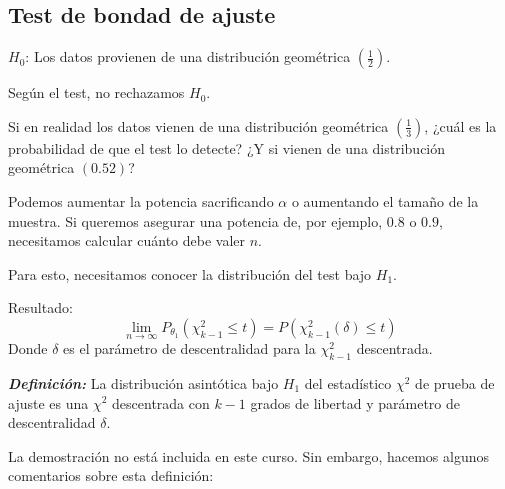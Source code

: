 \subsection{Test de bondad de ajuste}

\(H_0\): Los datos provienen de una distribución geométrica \(\left(\frac{1}{2}\right)\).

Según el test, no rechazamos \(H_0\).

Si en realidad los datos vienen de una distribución geométrica \(\left(\frac{1}{3}\right)\),  
¿cuál es la probabilidad de que el test lo detecte?  
¿Y si vienen de una distribución geométrica \((0.52)\)?

Podemos aumentar la potencia sacrificando \(\alpha\) o aumentando el tamaño de la muestra.  
Si queremos asegurar una potencia de, por ejemplo, \(0.8\) o \(0.9\), necesitamos calcular cuánto debe valer \(n\).

Para esto, necesitamos conocer la distribución del test bajo \(H_1\).

Resultado:
\[
\lim_{n \to \infty} P_{\theta_1} (\chi^2_{k-1} \leq t) = P(\chi^2_{k-1}(\delta) \leq t)
\]
Donde \(\delta\) es el parámetro de descentralidad para la \(\chi^2_{k-1}\) descentrada.

\textit{\textbf{Definición:}} La distribución asintótica bajo \(H_1\) del estadístico \(\chi^2\) de prueba de ajuste es una \(\chi^2\) descentrada con \(k-1\) grados de libertad y parámetro de descentralidad \(\delta\).

La demostración no está incluida en este curso. Sin embargo, hacemos algunos comentarios sobre esta definición:

